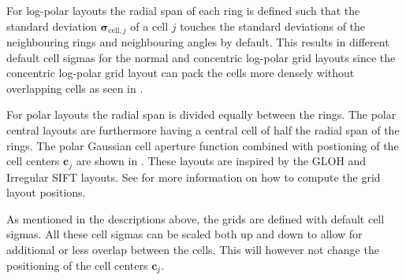 \documentclass[thesis.tex]{subfiles}
\def\c{\mathbf{c}}
\def\sigmacellj{\boldsymbol{\sigma}_{\text{cell},j}}
\begin{document}
For log-polar layouts the radial span of each ring is defined such that the standard deviation $\sigmacellj$ of a cell $j$ touches the standard deviations of the neighbouring rings and neighbouring angles by default. This results in different default cell sigmas for the normal and concentric log-polar grid layouts since the concentric log-polar grid layout can pack the cells more densely without overlapping cells as seen in .

For polar layouts the radial span is divided equally between the rings. The polar central layouts are furthermore having a central cell of half the radial span of the rings. The polar Gaussian cell aperture function combined with postioning of the cell centers $\c_j$ are shown in . These layouts are inspired by the GLOH \cite{mikolajczyk2005performance} and Irregular SIFT \cite{cui2009scale} layouts.
See  for more information on how to compute the grid layout positions.

As mentioned in the descriptions above, the grids are defined with default cell sigmas. All these cell sigmas can be scaled both up and down to allow for additional or less overlap between the cells. This will however not change the positioning of the cell centers $\c_j$.
\end{document}

